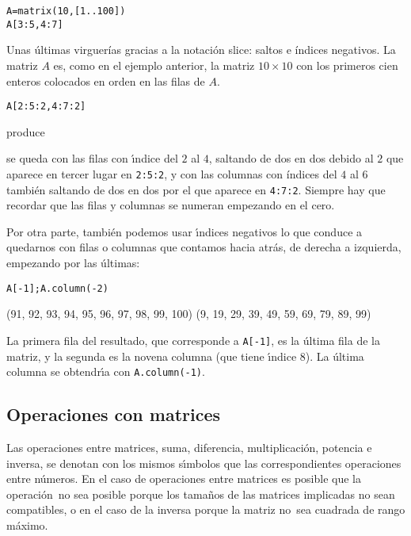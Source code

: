 \begin{lstlisting}
A=matrix(10,[1..100])
A[3:5,4:7]
\end{lstlisting}
\begin{Output}
	[35 36 37]
	[45 46 47]
\end{Output}

Unas últimas virguerías  gracias a la notación slice: saltos e índices
negativos. La matriz $A$ es, como en el ejemplo anterior, la matriz $10\times
10$ con los primeros cien enteros colocados en orden en las filas de $A$. 
\begin{lstlisting}
A[2:5:2,4:7:2]
\end{lstlisting}

\noindent produce 

\begin{Output}
	[25  27]
	[45  47]
\end{Output}
\noindent se queda con las filas con \'{\i}ndice del $2$ al $4$,
saltando de dos en dos debido al $2$ que aparece en tercer lugar en
\lstinline|2:5:2|, y con las columnas con \'indices del $4$ al $6$
tambi\'en saltando de dos en dos por el que aparece en \lstinline|4:7:2|.
Siempre hay que recordar que las filas y
columnas se numeran empezando en el cero.  

Por otra parte, tambi\'en podemos usar \'{\i}ndices negativos lo que conduce a
quedarnos con filas o columnas que contamos hacia atr\'as, de derecha a
izquierda,  empezando por las
\'ultimas:

\begin{lstlisting}
A[-1];A.column(-2)
\end{lstlisting}
\begin{Output}
	(91, 92, 93, 94, 95, 96, 97, 98, 99, 100)
	(9, 19, 29, 39, 49, 59, 69, 79, 89, 99)
\end{Output}

La primera fila del resultado, que corresponde a \lstinline|A[-1]|, es la
\'ultima fila de la matriz, y la segunda es la novena columna (que tiene
\'{\i}ndice $8$). La \'ultima columna se obtendr\'{\i}a con
\lstinline|A.column(-1)|.
	
	
\subsection{Operaciones con matrices}


Las operaciones entre matrices, suma, diferencia, multiplicaci\'on, potencia e
inversa, se denotan con los mismos s\'{\i}mbolos que las correspondientes
operaciones entre n\'umeros.  En el caso de operaciones entre matrices es
posible que la operaci\'on~no sea posible porque los tama\~nos de las matrices
implicadas no sean compatibles, o en el caso de la inversa porque la matriz 
no~sea cuadrada de rango m\'aximo. 




